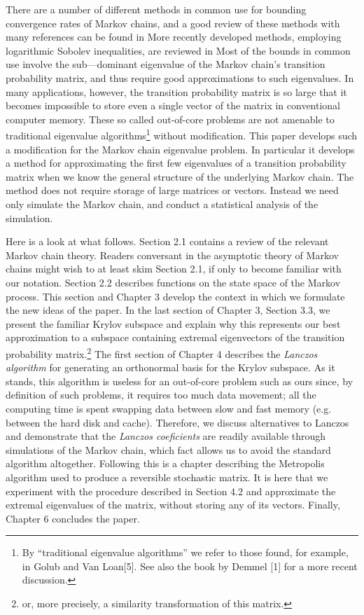 \documentclass{au}
\numberwithin{equation}{section}
\theoremstyle{plain}
\theoremstyle{definition}
\newcommand{\<}{\ensuremath{\langle}}
\renewcommand{\>}{\ensuremath{\rangle}}
\begin{document}
There are a number of different methods in common use for bounding convergence rates of
Markov chains, and a good review of these methods with many references can be found in  More
recently developed methods, employing logarithmic Sobolev inequalities, are reviewed in  Most
of the bounds in common use involve the sub—dominant eigenvalue of the Markov chain's transition
probability matrix, and thus require good approximations to such eigenvalues. In many applications,
however, the transition probability matrix is so large that it becomes impossible to store even a
single vector of the matrix in conventional computer memory. These so called out-of-core problems
are not amenable to traditional eigenvalue algorithms\footnote{By ``traditional
  eigenvalue algorithms'' we refer to those found, for example, in Golub and Van
  Loan[5]. See also the book by Demmel [1] for a more recent discussion.}
without modification. This paper develops 
such a modification for the Markov chain eigenvalue problem. In particular it develops a method
for approximating the first few eigenvalues of a transition probability matrix when we know the
general structure of the underlying Markov chain. The method does not require storage of large
matrices or vectors. Instead we need only simulate the Markov chain, and conduct a statistical
analysis of the simulation.

Here is a look at what follows. Section 2.1 contains a review of the relevant Markov chain
theory. Readers conversant in the asymptotic theory of Markov chains might wish to at least skim
Section 2.1, if only to become familiar with our notation. Section 2.2 describes functions on the state
space of the Markov process. This section and Chapter 3 develop the context in which we formulate
the new ideas of the paper. In the last section of Chapter 3, Section 3.3, we present the familiar
Krylov subspace and explain why this represents our best approximation to a subspace containing
extremal eigenvectors of the transition probability matrix.\footnote{or, more
  precisely, a similarity transformation of this matrix.} The first section of
Chapter 4 describes the \emph{Lanczos algorithm} for generating an orthonormal basis
for the Krylov subspace. As it stands, this algorithm is useless for an
out-of-core problem such as ours since, by definition of such problems, 
it requires too much data movement; all the computing time is spent swapping data between slow
and fast memory (e.g. between the hard disk and cache). Therefore, we discuss alternatives to
Lanczos and demonstrate that the \emph{Lanczos coeficients} are readily available through simulations of
the Markov chain, which fact allows us to avoid the standard algorithm altogether. Following this
is a chapter describing the Metropolis algorithm used to produce a reversible stochastic matrix.
It is here that we experiment with the procedure described in Section 4.2 and approximate the
extremal eigenvalues of the matrix, without storing any of its vectors. Finally, Chapter 6 concludes
the paper.
\end{document}

